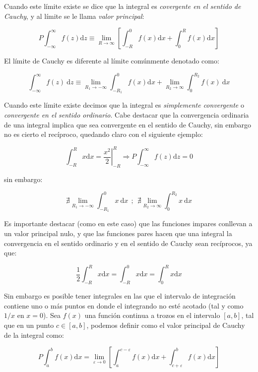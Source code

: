 \documentclass[12pt]{book}
\newcommand{\ccorchetes}[1]{\left[ #1  \right]}
\newcommand{\D}{\mathrm{d}}
\begin{document}
Cuando este límite existe se dice que la integral es \textit{covergente en el sentido de Cauchy}, y al límite se le llama \textit{valor principal}:

\begin{equation}
P \int_{-\infty}^{\infty} f(z) \D z \equiv \lim_{R \rightarrow \infty} \ccorchetes{\int_{-R}^0 f(x) \D x + \int_0^R f(x) \D x }
\end{equation}

El límite de Cauchy es diferente al límite comúnmente denotado como: 

\begin{equation}
\int_{-\infty}^{\infty} f(z) \ \D z \equiv  \lim_{R_1 \rightarrow  -\infty} \int_{-R_1}^0 f(x) \D x +  \lim_{R_2 \rightarrow  \infty} \int_0^{R_2} f(x) \ \D x 
\end{equation}

Cuando este límite existe decimos que la integral es \textit{simplemente convergente} o \textit{convergente en el sentido ordinario}. Cabe destacar que la convergencia ordinaria de una integral implica que sea convergente en el sentido de Cauchy, sin embargo no es cierto el recíproco, quedando claro con el siguiente ejemplo:

$$ \int_{-R}^R x \D x = \left. \dfrac{x^2}{2} \right|_{-R}^R \Longrightarrow P \int_{-\infty}^{\infty} f(z) \D z = 0 $$

sin embargo:

$$ \nexists \lim_{R_1 \rightarrow  -\infty} \int_{-R_1}^0 x \ \D x \ \ ; \ \ \nexists  \lim_{R_2 \rightarrow  \infty} \int_0^{R_2} x \ \D x $$ 

Es importante destacar (como en este caso) que las funciones impares conllevan a un valor principal nulo, y que las funciones pares hacen que una integral la convergencia en el sentido ordinario y en el sentido de Cauchy sean recíprocos, ya que:

$$ \dfrac{1}{2}  \int_{-R}^R x \D x  =  \int_{-R}^0 x \D x =  \int_{0}^R x \D x    $$

Sin embargo es posible tener integrales en las que el intervalo de integración contiene uno o más puntos en donde el integrando no esté acotado (tal y como $1/x$ en $x=0$). Sea $f(x)$ una función continua a trozos en el intervalo $[a,b]$, tal que en un punto $c \in [a,b]$, podemos definir como el valor principal de Cauchy de la integral como:

\begin{equation}
P \int_a^b f(x) \D x = \lim_ {\varepsilon \rightarrow 0} \ccorchetes{ \int_a^{c-\varepsilon} f(x) \D x + \int_{c + \varepsilon}^b f(x) \D x}
\end{equation}
\end{document}
